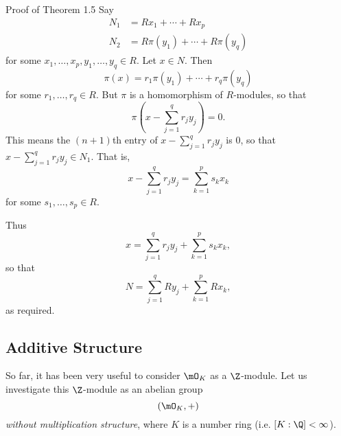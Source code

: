 \documentclass[pmath441]{subfiles}
\begin{document}
\begin{boxyproof}{Proof of Theorem 1.5}
        Say
        \begin{equation*}
            \begin{aligned}
                N_1 & = Rx_1 + \cdots + Rx_p \\
                N_2 & = R\pi\left( y_1 \right) + \cdots + R\pi\left( y_q \right)
            \end{aligned} 
        \end{equation*}
        for some $x_1,\ldots,x_p,y_1,\ldots,y_q\in R$. Let $x\in N$. Then
        \begin{equation*}
            \pi\left( x \right) = r_1\pi\left( y_1 \right) + \cdots + r_q\pi\left( y_q \right)
        \end{equation*}
        for some $r_1,\ldots,r_q\in R$. But $\pi$ is a homomorphism of $R$-modules, so that
        \begin{equation*}
            \pi\left( x - \sum^{q}_{j=1} r_jy_j \right) = 0.
        \end{equation*}
        This means the $\left( n+1 \right)$th entry of $x-\sum^{q}_{j=1}r_jy_j$ is $0$, so that $x-\sum^{q}_{j=1}r_jy_j\in N_1$. That is,
        \begin{equation*}
            x - \sum^{q}_{j=1}r_jy_j = \sum^{p}_{k=1} s_kx_k
        \end{equation*}
        for some $s_1,\ldots,s_p\in R$.

        Thus
        \begin{equation*}
            x = \sum^{q}_{j=1}r_jy_j + \sum^{p}_{k=1} s_kx_k,
        \end{equation*}
        so that
        \begin{equation*}
            N = \sum^{q}_{j=1}Ry_j + \sum^{p}_{k=1} Rx_k,
        \end{equation*}
        as required.
    \end{boxyproof}
    
    \subsection{Additive Structure}

    So far, it has been very useful to consider $\mO_K$ as a $\Z$-module. Let us investigate this $\Z$-module as an abelian group
    \begin{equation*}
        \left( \mO_K,+ \right)
    \end{equation*}
    \textit{without multiplication structure}, where $K$ is a number ring (i.e. $\left[ K:\Q \right]<\infty$).
\end{document}
